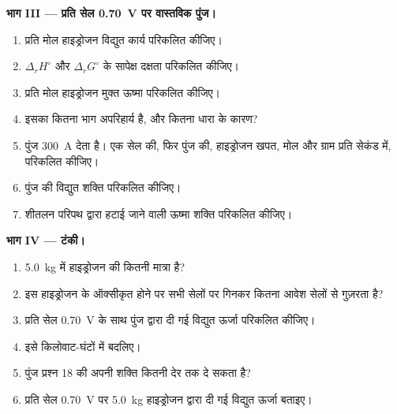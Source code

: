 \begin{problem}
\medskip
\noindent\textbf{भाग III --- प्रति सेल \qty{0.70}{V} पर वास्तविक पुंज।}
\begin{enumerate}[resume]
  \item प्रति मोल हाइड्रोजन विद्युत कार्य परिकलित कीजिए।
  \item $\Delta_r H^\circ$ और $\Delta_r G^\circ$ के सापेक्ष दक्षता परिकलित कीजिए।
  \item प्रति मोल हाइड्रोजन मुक्त ऊष्मा परिकलित कीजिए।
  \item इसका कितना भाग अपरिहार्य है, और कितना धारा के कारण?
  \item पुंज \qty{300}{A} देता है। एक सेल की, फिर पुंज की, हाइड्रोजन खपत,
        मोल और ग्राम प्रति सेकंड में, परिकलित कीजिए।
  \item पुंज की विद्युत शक्ति परिकलित कीजिए।
  \item शीतलन परिपथ द्वारा हटाई जाने वाली ऊष्मा शक्ति परिकलित कीजिए।
\end{enumerate}

\medskip
\noindent\textbf{भाग IV --- टंकी।}
\begin{enumerate}[resume]
  \item \qty{5.0}{kg} में हाइड्रोजन की कितनी मात्रा है?
  \item इस हाइड्रोजन के ऑक्सीकृत होने पर सभी सेलों पर गिनकर
        कितना आवेश सेलों से गुज़रता है?
  \item प्रति सेल \qty{0.70}{V} के साथ पुंज द्वारा दी गई विद्युत ऊर्जा
        परिकलित कीजिए।
  \item इसे किलोवाट-घंटों में बदलिए।
  \item पुंज प्रश्न 18 की अपनी शक्ति कितनी देर तक दे सकता है?
  \item प्रति सेल \qty{0.70}{V} पर \qty{5.0}{kg} हाइड्रोजन द्वारा दी गई विद्युत ऊर्जा
        बताइए।
\end{enumerate}
\end{problem}
